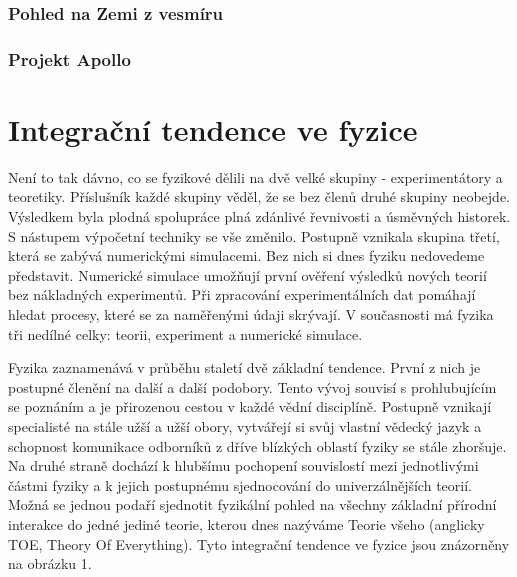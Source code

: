       
      \subsubsection{Pohled na Zemi z vesmíru}\label{fyz:IchapIIsecIVssecIVsssecI}  
      \subsubsection{Projekt Apollo}\label{fyz:IchapIIsecIVssecIVsssecII}    
  \section{Integrační tendence ve fyzice}\label{fyz:IchapIIsecV}
    Není to tak dávno, co se fyzikové dělili na dvě velké skupiny - experimentátory a teoretiky.
    Příslušník každé skupiny věděl, že se bez členů druhé skupiny neobejde. Výsledkem byla plodná
    spolupráce plná zdánlivé řevnivosti a úsměvných historek. S nástupem výpočetní techniky se vše
    změnilo. Postupně vznikala skupina třetí, která se zabývá numerickými simulacemi. Bez nich si
    dnes fyziku nedovedeme představit. Numerické simulace umožňují první ověření výsledků nových
    teorií bez nákladných experimentů. Při zpracování experimentálních dat pomáhají hledat procesy,
    které se za naměřenými údaji skrývají. V současnosti má fyzika tři nedílné celky: teorii,
    experiment a numerické simulace. 
    
    Fyzika zaznamenává v průběhu staletí dvě základní tendence. První z nich je postupné členění na
    další a další podobory. Tento vývoj souvisí s prohlubujícím se poznáním a je přirozenou cestou v
    každé vědní disciplíně. Postupně vznikají specialisté na stále užší a užší obory, vytvářejí si
    svůj vlastní vědecký jazyk a schopnost komunikace odborníků z dříve blízkých oblastí fyziky se
    stále zhoršuje. Na druhé straně dochází k hlubšímu pochopení souvislostí mezi jednotlivými
    částmi fyziky a k jejich postupnému sjednocování do univerzálnějších teorií. Možná se jednou
    podaří sjednotit fyzikální pohled na všechny základní přírodní interakce do jedné jediné teorie,
    kterou dnes nazýváme Teorie všeho (anglicky TOE, Theory Of Everything). Tyto integrační tendence
    ve fyzice jsou znázorněny na obrázku 1. 

    
